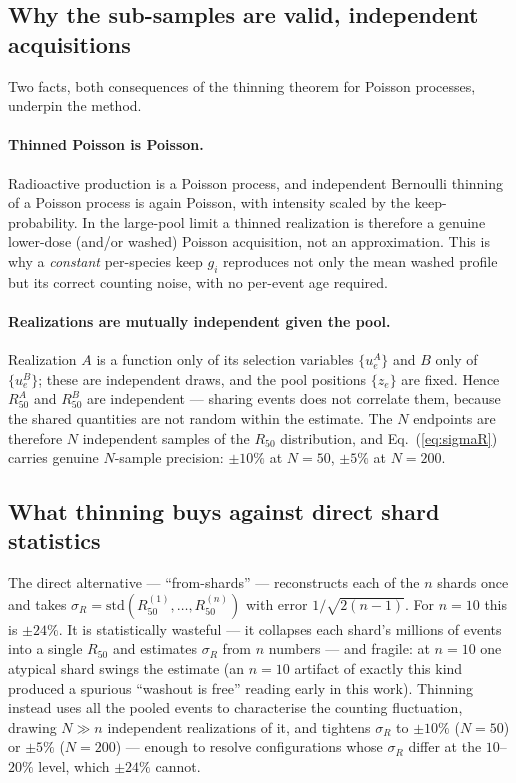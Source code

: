 \documentclass[11pt]{article}
\begin{document}
\subsection*{Why the sub-samples are valid, independent acquisitions}

Two facts, both consequences of the thinning theorem for Poisson processes,
underpin the method.

\paragraph{Thinned Poisson is Poisson.}
Radioactive production is a Poisson process, and independent Bernoulli thinning of
a Poisson process is again Poisson, with intensity scaled by the keep-probability.
In the large-pool limit a thinned realization is therefore a genuine lower-dose
(and/or washed) Poisson acquisition, not an approximation. This is why a
\emph{constant} per-species keep $g_i$ reproduces not only the mean washed profile
but its correct counting noise, with no per-event age required.

\paragraph{Realizations are mutually independent given the pool.}
Realization $A$ is a function only of its selection variables $\{u_e^{A}\}$ and
$B$ only of $\{u_e^{B}\}$; these are independent draws, and the pool positions
$\{z_e\}$ are fixed. Hence $R_{50}^{A}$ and $R_{50}^{B}$ are independent ---
sharing events does not correlate them, because the shared quantities are not
random within the estimate. The $N$ endpoints are therefore $N$ independent
samples of the $R_{50}$ distribution, and Eq.~(\ref{eq:sigmaR}) carries genuine
$N$-sample precision: $\pm10\%$ at $N=50$, $\pm5\%$ at $N=200$.

\subsection*{What thinning buys against direct shard statistics}

The direct alternative --- ``from-shards'' --- reconstructs each of the $n$ shards
once and takes $\sigma_R=\mathrm{std}(R_{50}^{(1)},\dots,R_{50}^{(n)})$ with error
$1/\sqrt{2(n-1)}$. For $n=10$ this is $\pm24\%$. It is statistically wasteful ---
it collapses each shard's millions of events into a single $R_{50}$ and estimates
$\sigma_R$ from $n$ numbers --- and fragile: at $n=10$ one atypical shard swings
the estimate (an $n=10$ artifact of exactly this kind produced a spurious
``washout is free'' reading early in this work). Thinning instead uses all the
pooled events to characterise the counting fluctuation, drawing $N\gg n$
independent realizations of it, and tightens $\sigma_R$ to $\pm10\%$ ($N=50$) or
$\pm5\%$ ($N=200$) --- enough to resolve configurations whose $\sigma_R$ differ at
the $10$--$20\%$ level, which $\pm24\%$ cannot.
\end{document}
